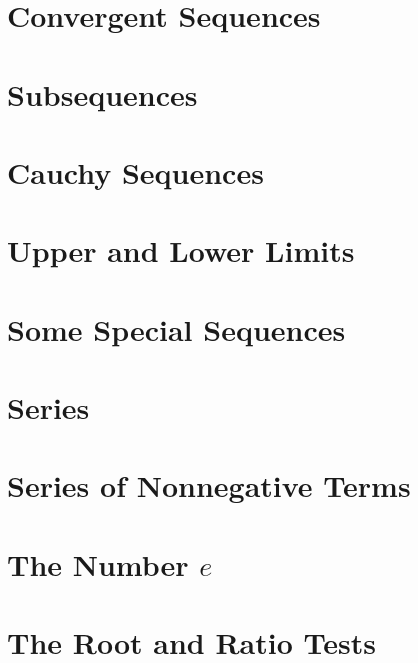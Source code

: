 
\section{Convergent Sequences}\label{sec:convergent-sequences}


\section{Subsequences}\label{sec:subsequences}


\section{Cauchy Sequences}\label{sec:cauchy-sequences}


\section{Upper and Lower Limits}\label{sec:upper-and-lower-limits}


\section{Some Special Sequences}\label{sec:some-special-sequences}


\section{Series}\label{sec:series}


\section{Series of Nonnegative Terms}\label{sec:series-of-nonnegative-terms}


\section{The Number $e$}\label{sec:the-number-e}


\section{The Root and Ratio Tests}\label{sec:the-root-and-ratio-tests}


